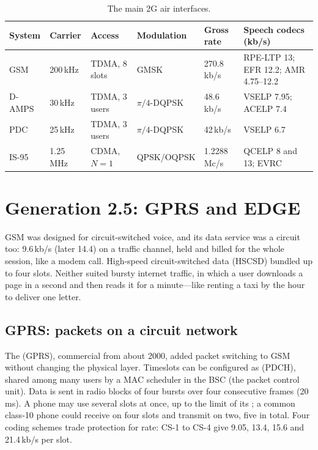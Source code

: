 \begin{table}[htbp]\centering\small
\caption{The main 2G air interfaces.}
\label{tab:ch21:2g}
\footnotesize
\begin{tabularx}{\linewidth}{@{}l l l l l >{\raggedright\arraybackslash}X@{}}
\toprule
System & Carrier & Access & Modulation & Gross rate & Speech codecs (kb/s)\\
\midrule
GSM & 200\,kHz & TDMA, 8 slots & GMSK & 270.8\,kb/s & RPE-LTP 13; EFR 12.2; AMR 4.75--12.2\\
D-AMPS & 30\,kHz & TDMA, 3 users & $\pi/4$-DQPSK & 48.6\,kb/s & VSELP 7.95; ACELP 7.4\\
PDC & 25\,kHz & TDMA, 3 users & $\pi/4$-DQPSK & 42\,kb/s & VSELP 6.7\\
IS-95 & 1.25\,MHz & CDMA, $N=1$ & QPSK/OQPSK & 1.2288\,Mc/s & QCELP 8 and 13; EVRC\\
\bottomrule
\end{tabularx}
\end{table}

\section{Generation 2.5: GPRS and EDGE}
\label{sec:ch21:gprs}

GSM was designed for circuit-switched voice, and its data service was a circuit too: 9.6\,kb/s
(later 14.4) on a traffic channel, held and billed for the whole session, like a modem call.
High-speed circuit-switched data (HSCSD) bundled up to four slots. Neither suited bursty internet
traffic, in which a user downloads a page in a second and then reads it for a minute---like renting
a taxi by the hour to deliver one letter.

\subsection{GPRS: packets on a circuit network}

The  (GPRS), commercial from about 2000, added packet switching
to GSM without changing the physical layer. Timeslots can be configured as
 (PDCH), shared among many users by a MAC scheduler in the BSC (the packet
control unit). Data is sent in radio blocks of four bursts over four consecutive frames (20\,ms). A
phone may use several slots at once, up to the limit of its ; a common
class-10 phone could receive on four slots and transmit on two, five in total. Four coding schemes
trade protection for rate: CS-1 to CS-4 give 9.05, 13.4, 15.6 and 21.4\,kb/s per slot.

